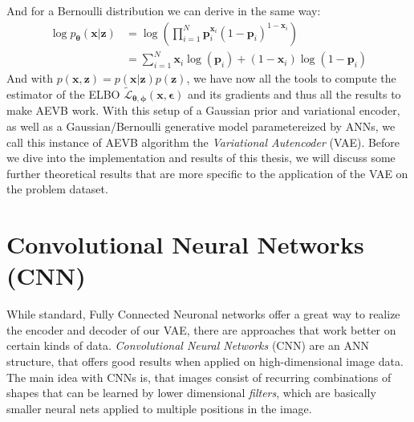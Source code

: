 \documentclass[12pt]{report}
\theoremstyle{definition}
\begin{document}
And for a Bernoulli distribution we can derive in the same way:
\begin{equation}
\begin{split}
\log p_{\pmb{\theta}}(\mathbf{x}|\mathbf{z}) 
& = \log \left(\prod_{i=1}^N \mathbf{p}_i^{\mathbf{x}_i}(1-\mathbf{p}_i)^{1-\mathbf{x}_i}\right) \\
& = \sum_{i=1}^N \mathbf{x}_i \log(\mathbf{p}_i) + (1 - \mathbf{x}_i) \log(1 - \mathbf{p}_i)
\end{split}
\end{equation}
And with $p(\mathbf{x}, \mathbf{z}) = p(\mathbf{x}|\mathbf{z})p(\mathbf{z})$, we have now all the tools to compute the estimator of the ELBO $\tilde{\mathcal{L}}_{\pmb{\theta}, \pmb{\phi}}(\mathbf{x}, \pmb{\epsilon})$ and its gradients and thus all the results to make AEVB work. With this setup of a Gaussian prior and variational encoder, as well as a Gaussian/Bernoulli generative model parametereized by ANNs, we call this instance of AEVB algorithm the \emph{Variational Autencoder} (VAE). Before we dive into the implementation and results of this thesis, we will discuss some further theoretical results that are more specific to the application of the VAE on the problem dataset. 


\section{Convolutional Neural Networks (CNN)}
While standard, Fully Connected Neuronal networks offer a great way to realize the encoder and decoder of our VAE, there are approaches that work better on certain kinds of data. \emph{Convolutional Neural Networks} (CNN) are an ANN structure, that offers good results when applied on high-dimensional image data. The main idea with CNNs is, that images consist of recurring combinations of shapes that can be learned by lower dimensional \emph{filters}, which are basically smaller neural nets applied to multiple positions in the image. 
\end{document}
